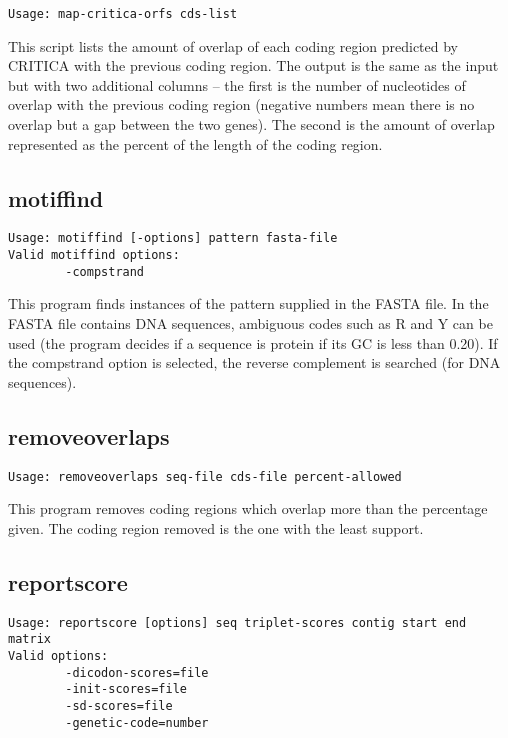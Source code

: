 \documentclass{article}
\begin{document}
\begin{verbatim}
Usage: map-critica-orfs cds-list
\end{verbatim}

This script lists the amount of overlap of each coding region
predicted by CRITICA with the previous coding region. The output is
the same as the input but with two additional columns -- the first is
the number of nucleotides of overlap with the previous coding region
(negative numbers mean there is no overlap but a gap between the two
genes). The second is the amount of overlap represented as the percent
of the length of the coding region. 

\subsection{motiffind}

\begin{verbatim}
Usage: motiffind [-options] pattern fasta-file
Valid motiffind options:
        -compstrand
\end{verbatim}

This program finds instances of the pattern supplied in the FASTA
file. In the FASTA file contains DNA sequences, ambiguous codes such as
R and Y can be used (the program decides if a sequence is protein if
its GC is less than 0.20). If the compstrand option is
selected, the reverse complement is searched (for DNA sequences).

\subsection{removeoverlaps}

\begin{verbatim}
Usage: removeoverlaps seq-file cds-file percent-allowed
\end{verbatim}
 
This program removes coding regions which overlap more than the
percentage given. The coding region removed is the one with the least
support.

\subsection{reportscore}

\begin{verbatim}
Usage: reportscore [options] seq triplet-scores contig start end matrix
Valid options:
        -dicodon-scores=file
        -init-scores=file
        -sd-scores=file
        -genetic-code=number
\end{verbatim}
\end{document}
